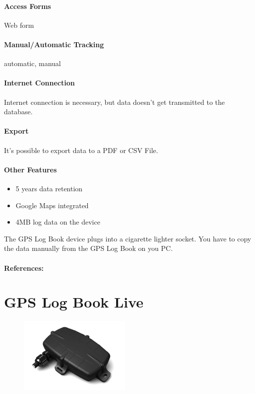 \paragraph{Access Forms} Web form
\paragraph{Manual/Automatic Tracking}automatic, manual
\paragraph{Internet Connection}Internet connection is necessary, but data doesn't get transmitted to the database.
\paragraph{Export}It's possible to export data to a PDF or CSV File.
\paragraph{Other Features}
\begin{itemize}
\item 5 years data retention 
\item Google Maps integrated
\item 4MB log data on the device
\end{itemize}
The GPS Log Book device plugs into a cigarette lighter socket. You have to copy the data manually from the GPS Log Book on you PC.
\paragraph{References:} \cite{GPS_Log_Book}
\newpage

\section{GPS Log Book Live}
\begin{figure}
  \begin{center}
    \includegraphics[width=0.48\textwidth]{bilder/GPSlogbooklive!}
  \end{center}
\end{figure}
